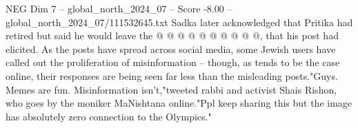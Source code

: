 \begin{textsample}{NEG Dim 7 – global\_north\_2024\_07 – Score -8.00 – global\_north\_2024\_07/111532645.txt}
Sadka later acknowledged that Pritika had retired but said he would leave the @ @ @ @ @ @ @ @ @ @, that his post had elicited.
As the posts have spread across social media, some Jewish users have called out the proliferation of misinformation -- though, as tends to be the case online, their responses are being seen far less than the misleading posts."Guys.
Memes are fun.
Misinformation isn't,"tweeted rabbi and activist Shais Rishon, who goes by the moniker MaNishtana online."Ppl keep sharing this but the image has absolutely zero connection to the Olympics."

\end{textsample}

